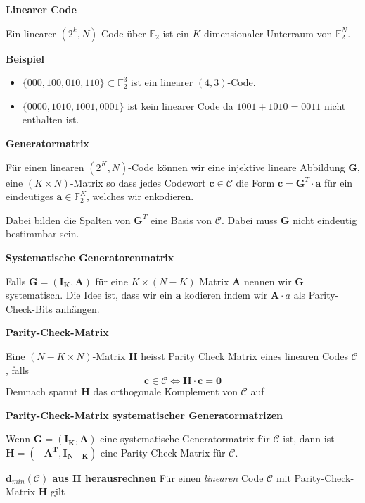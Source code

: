 \documentclass[25pt]{sciposter}
\newcommand{\C}{\mathcal{C}}
\newenvironment{defn}[1]{\begin{mdframed}[backgroundcolor=blue!10,innertopmargin=15pt, nobreak=true,innerbottommargin=15pt]
		\textbf{#1 }
	}
	{ 
	\end{mdframed}
}
\newenvironment{thm}[1]{\begin{mdframed}[nobreak=true,backgroundcolor=Emerald!10,innertopmargin=15pt, innerbottommargin=15pt]
		\textbf{#1 }
	}
	{ 
	\end{mdframed}
}
\begin{document}
\begin{multicols}{3}
\begin{defn}{Linearer Code}
	Ein linearer $(2^k,N)$ Code über $\mathbb{F}_2$ ist ein $K$-dimensionaler Unterraum von $\mathbb{F}_2^N$.
\end{defn}

\textbf{Beispiel}
\begin{itemize}
	\item $\{000,100,010,110\} \subset \mathbb{F}_2^3$ ist ein linearer $(4,3)$-Code.
	\item $\{0000,1010,1001,0001\}$ ist kein linearer Code da $1001+1010=0011$ nicht enthalten ist.
\end{itemize}

\begin{defn}{Generatormatrix}
	Für einen linearen $(2^K,N)$-Code können wir eine injektive lineare Abbildung $\mathbf{G}$, eine $(K\times N)$-Matrix so dass jedes Codewort $\mathbf{c}\in\C$ die Form $\mathbf{c} = \mathbf{G}^T \cdot \mathbf{a}$ für ein eindeutiges $\mathbf{a} \in \mathbb{F}_2^K$, welches wir enkodieren.
\end{defn}

Dabei bilden die Spalten von $\mathbf{G}^T$ eine Basis von $\C$. Dabei muss $\mathbf{G}$ nicht eindeutig bestimmbar sein.

\begin{defn}{Systematische Generatorenmatrix}
	Falls $\mathbf{G = (I_K,A)}$ für eine $K\times (N-K)$ Matrix $\mathbf{A}$ nennen wir $\mathbf{G}$ systematisch. Die Idee ist, dass wir ein $\mathbf{a}$ kodieren indem wir $\mathbf{A}\cdot a$ als Parity-Check-Bits anhängen.
\end{defn}

\begin{defn}{Parity-Check-Matrix}
	Eine $(N-K\times N)$-Matrix $\mathbf{H}$ heisst Parity Check Matrix eines linearen Codes $\C$, falls $$\mathbf{c} \in \C \iff \mathbf{H\cdot c = 0}$$ 
	Demnach spannt $\mathbf{H}$ das orthogonale Komplement von $\C$ auf
\end{defn}


\begin{thm}{Parity-Check-Matrix systematischer Generatormatrizen}
	Wenn $\mathbf{G = (I_K,A)}$ eine systematische Generatormatrix für $\C$ ist, dann ist $\mathbf{H = (-A^T,I_{N-K})}$ eine Parity-Check-Matrix für $\C$.
\end{thm}

\begin{thm}{$\mathbf d_{min}(\C)$ aus $\mathbf{H}$ herausrechnen} Für einen \textit{linearen} Code $\C$ mit Parity-Check-Matrix $\mathbf{H}$ gilt
	

\end{thm}
\end{multicols}
\end{document}
